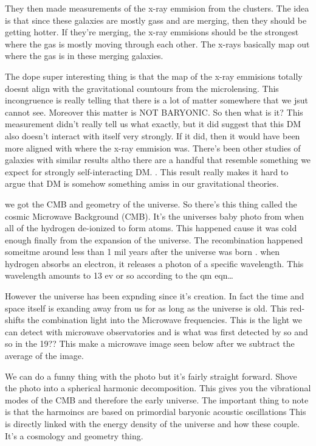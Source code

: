 They then made measurements of the x-ray emmision from the clusters.
The idea is that since these galaxies are mostly gass and are merging, then they should be getting hotter.
If they're merging, the x-ray emmisions should be the strongest where the gas is mostly moving through each other.
The x-rays basically map out where the gas is in these merging galaxies.


The dope super interesting thing is that the map of the x-ray emmisions totally doesnt align with the gravitational countours from the microlensing.
This incongruence is really telling that there is a lot of matter somewhere that we jsut cannot see.
Moreover this matter is NOT BARYONIC.
So then what is it?
This measurement didn't really tell us what exactly, but it did suggest that this DM also doesn't interact with itself very strongly.
If it did, then it would have been more aligned with where the x-ray emmision was.
There's been other studies of galaxies with similar results altho there are a handful that resemble something we expect for strongly self-interacting DM. \ns.
This result really makes it hard to argue that DM is somehow something amiss in our gravitational theories.

we got the CMB and geometry of the universe.
So there's this thing called the cosmic Microwave Background (CMB).
It's the universes baby photo from when all of the hydrogen de-ionized to form atoms.
This happened cause it was cold enough finally from the expansion of the universe.
The recombination happened someitme around less than 1 mil years after the universe was born \fu \ns.
when hydrogen absorbs an electron, it releases a photon of a specific wavelength.
This wavelength amounts to 13 ev or so according to the qm eqn\dots


However the universe has been expnding since it's creation.
In fact the time and space itself is exanding away from us for as long as the universe is old.
This red-shifts the combination light into the Microwave frequencies.
This is the light we can detect with microwave observatories and is what was first detected by so and so in the 19?? \ns \fu
This make a microwave image seen below after we subtract the average of the image.


We can do a funny thing with the photo but it's fairly straight forward.
Shove the photo into a spherical harmonic decomposition.
This gives you the vibrational modes of the CMB and therefore the early universe.
The important thing to note is that the harmoincs are based on primordial baryonic acoustic oscillations \fu
This is directly linked with the energy density of the universe and how these couple.
It's a cosmology and geometry thing.

